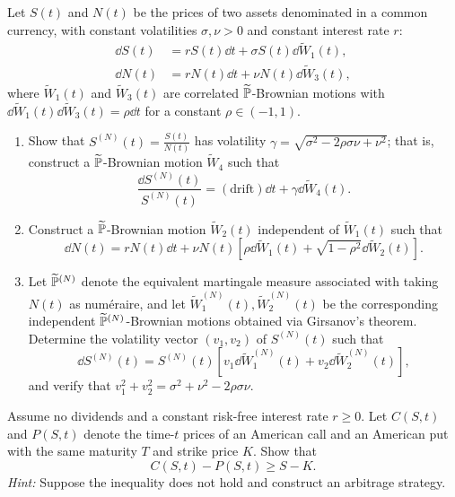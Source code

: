 \begin{problem}
    Let $S(t)$ and $N(t)$ be the prices of two assets denominated in a common currency, with constant volatilities $\sigma, \nu > 0$ and constant interest rate $r$:
    \begin{align*}
    \dd S(t) &= r S(t)\dd t + \sigma S(t)\dd\widetilde{W}_1(t), \\
    \dd N(t) &= r N(t)\dd t + \nu N(t)\dd\widetilde{W}_3(t),
    \end{align*}
    where $\widetilde{W}_1(t)$ and $\widetilde{W}_3(t)$ are correlated $\widetilde{\mathbb{P}}$-Brownian motions with $\dd\widetilde{W}_1(t)\dd\widetilde{W}_3(t) = \rho\dd t$ for a constant $\rho \in (-1, 1)$.
    \begin{enumerate}
        \item Show that $S^{(N)}(t) = \frac{S(t)}{N(t)}$ has volatility $\gamma = \sqrt{\sigma^2 - 2\rho\sigma\nu + \nu^2}$; that is, construct a $\widetilde{\mathbb{P}}$-Brownian motion $\widetilde{W}_4$ such that
        \[
        \frac{\dd S^{(N)}(t)}{S^{(N)}(t)} = (\text{drift})\dd t + \gamma\dd\widetilde{W}_4(t).
        \]
        \item Construct a $\widetilde{\mathbb{P}}$-Brownian motion $\widetilde{W}_2(t)$ independent of $\widetilde{W}_1(t)$ such that
        \[
        \dd N(t) = r N(t)\dd t + \nu N(t)\left[\rho\dd\widetilde{W}_1(t) + \sqrt{1 - \rho^2}\dd\widetilde{W}_2(t)\right].
        \]
        \item Let $\widetilde{\mathbb{P}}^{(N)}$ denote the equivalent martingale measure associated with taking $N(t)$ as num\'eraire, and let $\widetilde{W}_1^{(N)}(t), \widetilde{W}_2^{(N)}(t)$ be the corresponding independent $\widetilde{\mathbb{P}}^{(N)}$-Brownian motions obtained via Girsanov's theorem. Determine the volatility vector $(v_1, v_2)$ of $S^{(N)}(t)$ such that
        \[
        \dd S^{(N)}(t) = S^{(N)}(t)\left[v_1\dd\widetilde{W}_1^{(N)}(t) + v_2\dd\widetilde{W}_2^{(N)}(t)\right],
        \]
        and verify that $v_1^2 + v_2^2 = \sigma^2 + \nu^2 - 2\rho\sigma\nu$.
    \end{enumerate}
\end{problem}

\begin{problem}
    Assume no dividends and a constant risk-free interest rate $r \geq 0$. Let $C(S, t)$ and $P(S, t)$ denote the time-$t$ prices of an American call and an American put with the same maturity $T$ and strike price $K$. Show that
    \[
    C(S, t) - P(S, t) \geq S - K.
    \]
    \emph{Hint:} Suppose the inequality does not hold and construct an arbitrage strategy.
\end{problem}

